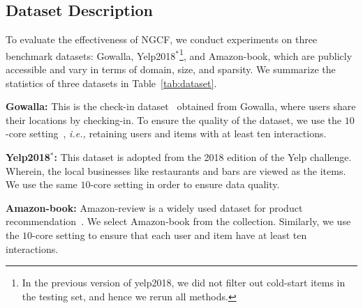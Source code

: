 \documentclass[sigconf]{acmart}
\newcommand{\ie}{\emph{i.e., }}
\theoremstyle{definition}
\begin{document}
\begin{table}[t]
\caption{Statistics of the datasets.}
\vspace{-10px}
\label{tab:dataset}
\vspace{-15px}
\end{table}

\subsection{Dataset Description}
To evaluate the effectiveness of NGCF, we conduct experiments on three benchmark datasets: Gowalla, Yelp2018$^{*}$\footnote{In the previous version of yelp2018, we did not filter out cold-start items in the testing set, and hence we rerun all methods.}, and Amazon-book, which are publicly accessible and vary in terms of domain, size, and sparsity.
We summarize the statistics of three datasets in Table~\ref{tab:dataset}.

\vspace{2px}
\noindent\textbf{Gowalla:}
This is the check-in dataset~\cite{gowalla} obtained from Gowalla, where users share their locations by checking-in.
To ensure the quality of the dataset, we use the $10$-core setting~\cite{VBPR}, \ie retaining users and items with at least ten interactions.

\vspace{2px}
\noindent\textbf{Yelp2018$^{*}$:}
This dataset is adopted from the 2018 edition of the Yelp challenge.
Wherein, the local businesses like restaurants and bars are viewed as the items.
We use the same $10$-core setting in order to ensure data quality.

\vspace{2px}
\noindent\textbf{Amazon-book:}
Amazon-review is a widely used dataset for product recommendation~\cite{amazon-review}.
We select Amazon-book from the collection.
Similarly, we use the $10$-core setting to ensure that each user and item have at least ten interactions.
\end{document}
